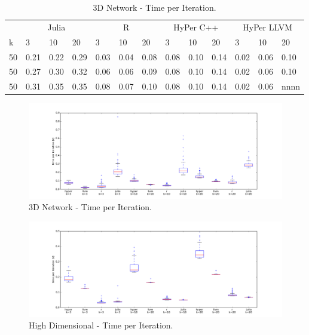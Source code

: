 \begin{table}[htsb]
  \caption[3D Network - Time per Iteration]{3D Network - Time per Iteration.}
  \label{tab:network_all}
  \centering
  \begin{tabular}{l l l l l l l l l l l l l}
    \toprule
      & \multicolumn{3}{c}{Julia} & \multicolumn{3}{c}{R} & \multicolumn{3}{c}{HyPer C++} & \multicolumn{3}{c}{HyPer LLVM}  \\
      k & 3 & 10 & 20 & 3 & 10 & 20 & 3 & 10 & 20 & 3 & 10 & 20 \\
    \midrule
      50  & 0.21 & 0.22 & 0.29 & 0.03 & 0.04 & 0.08 & 0.08 & 0.10 & 0.14 & 0.02 & 0.06 & 0.10 \\
      50  & 0.27 & 0.30 & 0.32 & 0.06 & 0.06 & 0.09 & 0.08 & 0.10 & 0.14 & 0.02 & 0.06 & 0.10 \\
      50  & 0.31 & 0.35 & 0.35 & 0.08 & 0.07 & 0.10 & 0.08 & 0.10 & 0.14 & 0.02 & 0.06 & nnnn \\
    \bottomrule
  \end{tabular}
\end{table}


\begin{figure}[htsb]
  \raggedleft
  \includegraphics[scale=0.4, trim="0cm 1cm 0cm 0cm"]{figures/charts/network_all}
  \caption[3D Network - Time per Iteration]{3D Network - Time per Iteration.}
  \label{fig:network_all}
\end{figure}

\begin{figure}[htsb]
  \raggedleft
  \includegraphics[scale=0.4, trim="0cm 1cm 0cm 0cm"]{figures/charts/50000_all}
  \caption[High Dimensional - Time per Iteration]{High Dimensional - Time per Iteration.}
  \label{fig:50000_all}
\end{figure}

